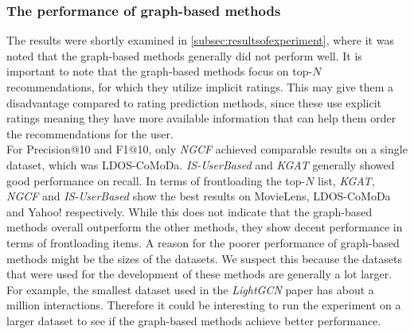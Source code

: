 \subsubsection{The performance of graph-based methods} 
The results were shortly examined in \autoref{subsec:resultsofexperiment}, where it was noted that the graph-based methods generally did not perform well.
It is important to note that the graph-based methods focus on top-$N$ recommendations, for which they utilize implicit ratings.
This may give them a disadvantage compared to rating prediction methods, since these use explicit ratings meaning they have more available information that can help them order the recommendations for the user.
\\
For Precision@10 and F1@10, only \textit{NGCF} achieved comparable results on a single dataset, which was LDOS-CoMoDa.
\textit{IS-UserBased} and \textit{KGAT} generally showed good performance on recall.
In terms of frontloading the top-$N$ list, \textit{KGAT}, \textit{NGCF} and \textit{IS-UserBased} show the best results on MovieLens, LDOS-CoMoDa and Yahoo! respectively.
While this does not indicate that the graph-based methods overall outperform the other methods, they show decent performance in terms of frontloading items.
A reason for the poorer performance of graph-based methods might be the sizes of the datasets.
We suspect this because the datasets that were used for the development of these methods are generally a lot larger.
For example, the smallest dataset used in the \textit{LightGCN}\cite{LightGCN} paper has about a million interactions.
Therefore it could be interesting to run the experiment on a larger dataset to see if the graph-based methods achieve better performance.
